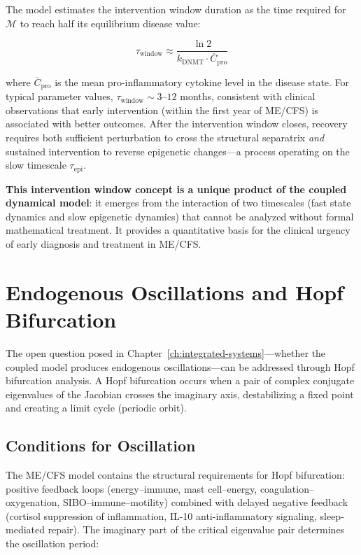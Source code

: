 The model estimates the intervention window duration as the time required for $\mathcal{M}$ to reach half its equilibrium disease value:

\begin{equation}
\label{eq:intervention-window}
\tau_{\text{window}} \approx \frac{\ln 2}{k_{\text{DNMT}} \cdot \overline{C}_{\text{pro}}}
\end{equation}

where $\overline{C}_{\text{pro}}$ is the mean pro-inflammatory cytokine level in the disease state. For typical parameter values, $\tau_{\text{window}} \sim 3$--$12$ months, consistent with clinical observations that early intervention (within the first year of ME/CFS) is associated with better outcomes. After the intervention window closes, recovery requires both sufficient perturbation to cross the structural separatrix \emph{and} sustained intervention to reverse epigenetic changes---a process operating on the slow timescale $\tau_{\text{epi}}$.

\textbf{This intervention window concept is a unique product of the coupled dynamical model}: it emerges from the interaction of two timescales (fast state dynamics and slow epigenetic dynamics) that cannot be analyzed without formal mathematical treatment. It provides a quantitative basis for the clinical urgency of early diagnosis and treatment in ME/CFS.

\section{Endogenous Oscillations and Hopf Bifurcation}
\label{sec:oscillation-analysis}

The open question posed in Chapter~\ref{ch:integrated-systems}---whether the coupled model produces endogenous oscillations---can be addressed through Hopf bifurcation analysis. A Hopf bifurcation occurs when a pair of complex conjugate eigenvalues of the Jacobian crosses the imaginary axis, destabilizing a fixed point and creating a limit cycle (periodic orbit).

\subsection{Conditions for Oscillation}

The ME/CFS model contains the structural requirements for Hopf bifurcation: positive feedback loops (energy--immune, mast cell--energy, coagulation--oxygenation, SIBO--immune--motility) combined with delayed negative feedback (cortisol suppression of inflammation, IL-10 anti-inflammatory signaling, sleep-mediated repair). The imaginary part of the critical eigenvalue pair determines the oscillation period:

